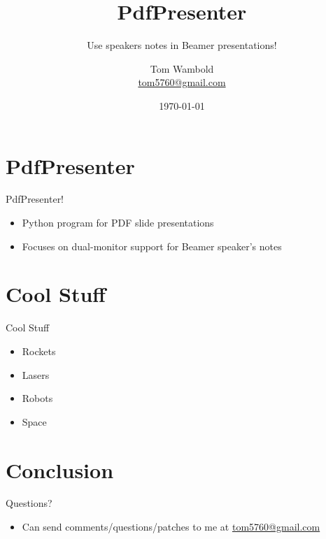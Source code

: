 \documentclass{beamer}
\title[PdfPresenter]{PdfPresenter}
\subtitle{Use speakers notes in Beamer presentations!}
\author[Tom Wambold]{Tom Wambold \\\href{mailto:tom5760@gmail.com}{tom5760@gmail.com}}
\date{\today}
\begin{document}

\begin{frame}
    \titlepage
\end{frame}


\section{PdfPresenter}

\begin{frame}{PdfPresenter!}
    \begin{itemize}
        \item Python program for PDF slide presentations
        \item Focuses on dual-monitor support for Beamer speaker's notes
    \end{itemize}
\end{frame}

\section{Cool Stuff}

\begin{frame}{Cool Stuff}
    \begin{itemize}
        \item Rockets
        \item Lasers
        \item Robots
        \item Space
    \end{itemize}
\end{frame}


\section{Conclusion}
\begin{frame}{Questions?}
    \begin{itemize}
        \item Can send comments/questions/patches to me at
            \href{mailto:tom5760@gmail.com}{tom5760@gmail.com}
    \end{itemize}
\end{frame}

\end{document}
